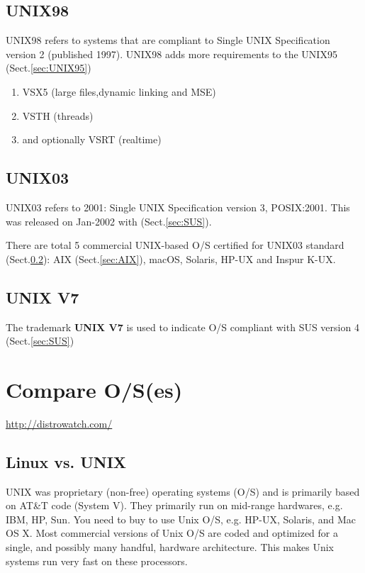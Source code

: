 \subsection{UNIX98}
\label{sec:UNIX98}

UNIX98 refers to systems that are compliant to Single UNIX Specification version
2 (published 1997). UNIX98 adds more requirements to the UNIX95
(Sect.\ref{sec:UNIX95})
\begin{enumerate}
  \item VSX5 (large files,dynamic linking and MSE)
  \item VSTH (threads)
  \item and optionally VSRT (realtime)
\end{enumerate}

\subsection{UNIX03}
\label{sec:UNIX03}

UNIX03 refers to 2001: Single UNIX Specification version 3, POSIX:2001. This was
released on Jan-2002 with (Sect.\ref{sec:SUS}).

There are total 5 commercial UNIX-based O/S certified for UNIX03 standard
(Sect.\ref{sec:UNIX03}): AIX (Sect.\ref{sec:AIX}), macOS, Solaris, HP-UX and
Inspur K-UX. 

\subsection{ UNIX V7}
\label{sec:UNIX-V7}

The trademark {\bf UNIX V7} is used to indicate O/S compliant with SUS version 4
(Sect.\ref{sec:SUS})

\section{Compare O/S(es)}

\url{http://distrowatch.com/}

\subsection{Linux vs. UNIX}

UNIX was proprietary (non-free) operating systems (O/S) and is primarily based
on AT\&T code (System V). They primarily run on mid-range hardwares, e.g. IBM,
HP, Sun. You need to buy to use Unix O/S, e.g. HP-UX, Solaris, and Mac OS X.
Most commercial versions of Unix O/S are coded and optimized for a single, and
possibly many handful, hardware architecture. This makes Unix systems run very
fast on these processors.

